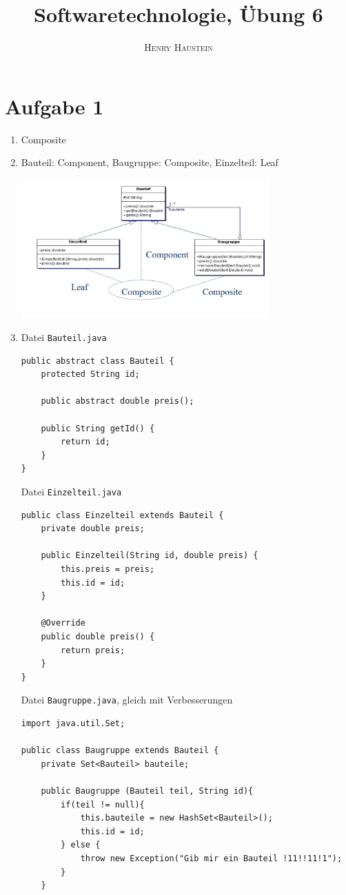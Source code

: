 \documentclass{article}
\title{\textbf{Softwaretechnologie, Übung 6}}
\author{\textsc{Henry Haustein}}
\date{}
\begin{document}
	\maketitle
	
	\section*{Aufgabe 1}
	\begin{enumerate}[label=(\alph*)]
		\item Composite
		\item Bauteil: Component, Baugruppe: Composite, Einzelteil: Leaf
		\begin{center}
			\includegraphics[width=0.75\textwidth]{aufgabe1}
		\end{center}
		\item Datei \texttt{Bauteil.java}
		\begin{lstlisting}[style=java, tabsize=2]
public abstract class Bauteil {
	protected String id;

	public abstract double preis();

	public String getId() {
		return id;
	}
}
		\end{lstlisting}
		Datei \texttt{Einzelteil.java}
		\begin{lstlisting}[style=java, tabsize=2]
public class Einzelteil extends Bauteil {
	private double preis;

	public Einzelteil(String id, double preis) {
		this.preis = preis;
		this.id = id;
	}

	@Override
	public double preis() {
		return preis;
	}
}
		\end{lstlisting}
		Datei \texttt{Baugruppe.java}, gleich mit Verbesserungen
		\begin{lstlisting}[style=java, tabsize=2]
import java.util.Set;

public class Baugruppe extends Bauteil {
	private Set<Bauteil> bauteile;

	public Baugruppe (Bauteil teil, String id){
		if(teil != null){
			this.bauteile = new HashSet<Bauteil>();
			this.id = id;
		} else {
			throw new Exception("Gib mir ein Bauteil !11!!11!1");
		}
	}


\end{lstlisting}
\end{enumerate}
\end{document}
